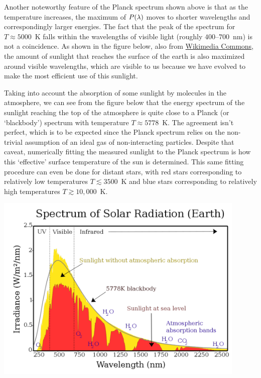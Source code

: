 Another noteworthy feature of the Planck spectrum shown above is that as the temperature increases, the maximum of $P(\lambda)$ moves to shorter wavelengths and correspondingly larger energies.
The fact that the peak of the spectrum for $T \approx 5000$~K falls within the wavelengths of visible light (roughly $400$--$700$~nm) is not a coincidence.
As shown in the figure below, also from \href{https://commons.wikimedia.org/wiki/File:Solar_spectrum_en.svg}{Wikimedia Commons}, the amount of sunlight that reaches the surface of the earth is also maximized around visible wavelengths, which are visible to us because we have evolved to make the most efficient use of this sunlight.

Taking into account the absorption of some sunlight by molecules in the atmosphere, we can see from the figure below that the energy spectrum of the sunlight reaching the top of the atmosphere is quite close to a Planck (or `blackbody') spectrum with temperature $T \approx 5778$~K.
The agreement isn't perfect, which is to be expected since the Planck spectrum relies on the non-trivial assumption of an ideal gas of non-interacting particles.
Despite that caveat, numerically fitting the measured sunlight to the Planck spectrum is how this `effective' surface temperature of the sun is determined.
This same fitting procedure can even be done for distant stars, with red stars corresponding to relatively low temperatures $T \lesssim 3500$~K and blue stars corresponding to relatively high temperatures $T \gtrsim 10{,}000$~K.

\begin{center}\includegraphics[width=0.9\textwidth]{figs/unit08_sun.pdf}\end{center} %

